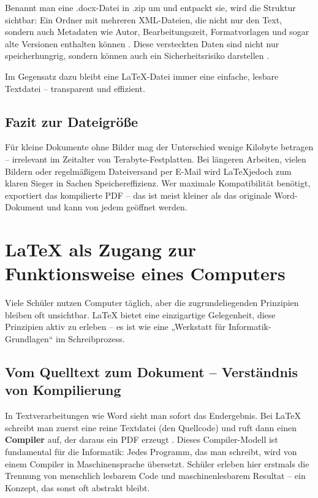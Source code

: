\documentclass[a4paper,12pt]{article}
\begin{document}
	Benannt man eine .docx-Datei in .zip um und entpackt sie, wird die Struktur sichtbar: Ein Ordner mit mehreren XML-Dateien, die nicht nur den Text, sondern auch Metadaten wie Autor, Bearbeitungszeit, Formatvorlagen und sogar alte Versionen enthalten können \cite{allendowney-metadata}. Diese versteckten Daten sind nicht nur speicherhungrig, sondern können auch ein Sicherheitsrisiko darstellen \cite{allendowney-security}.
	
	Im Gegensatz dazu bleibt eine \LaTeX-Datei immer eine einfache, lesbare Textdatei – transparent und effizient.
	
	\subsection{Fazit zur Dateigröße}
	
	Für kleine Dokumente ohne Bilder mag der Unterschied wenige Kilobyte betragen – irrelevant im Zeitalter von Terabyte-Festplatten. Bei längeren Arbeiten, vielen Bildern oder regelmäßigem Dateiversand per E-Mail wird \LaTeX jedoch zum klaren Sieger in Sachen Speichereffizienz. Wer maximale Kompatibilität benötigt, exportiert das kompilierte PDF – das ist meist kleiner als das originale Word-Dokument und kann von jedem geöffnet werden.
	
	\section{LaTeX als Zugang zur Funktionsweise eines Computers}
	\label{sec:informatik-grundlagen}
	
	Viele Schüler nutzen Computer täglich, aber die zugrundeliegenden Prinzipien bleiben oft unsichtbar. LaTeX bietet eine einzigartige Gelegenheit, diese Prinzipien aktiv zu erleben – es ist wie eine „Werkstatt für Informatik-Grundlagen“ im Schreibprozess.
	
	\subsection{Vom Quelltext zum Dokument – Verständnis von Kompilierung}
	In Textverarbeitungen wie Word sieht man sofort das Endergebnis. Bei LaTeX schreibt man zuerst eine reine Textdatei (den Quellcode) und ruft dann einen \textbf{Compiler} auf, der daraus ein PDF erzeugt \cite{knuth-compiler}. Dieses Compiler-Modell ist fundamental für die Informatik: Jedes Programm, das man schreibt, wird von einem Compiler in Maschinensprache übersetzt. Schüler erleben hier erstmals die Trennung von menschlich lesbarem Code und maschinenlesbarem Resultat – ein Konzept, das sonst oft abstrakt bleibt.
	
\end{document}
